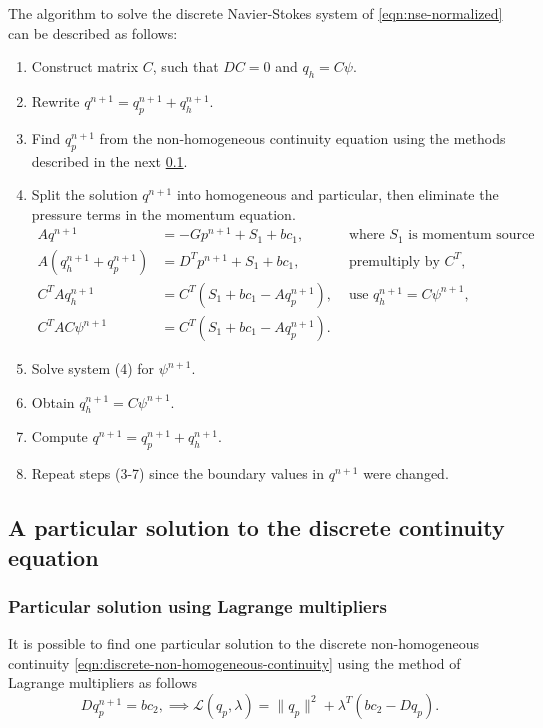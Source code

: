 \documentclass{article}
\begin{document}
The algorithm to solve the discrete Navier-Stokes system of \cref{eqn:nse-normalized} can be described as follows:
\begin{enumerate}
	\item Construct matrix $C$, such that $DC=0$ and $q_h=C\psi$.
	\item Rewrite $q^{n+1}=q^{n+1}_p+q^{n+1}_h$.
	\item Find $q^{n+1}_p$ from the non-homogeneous continuity equation using the methods described in the next \cref{sec:continuity-particular-solution}.
	\item Split the solution $q^{n+1}$ into homogeneous and particular, then eliminate the pressure terms in the momentum equation.
		\begin{align*}
			Aq^{n+1}&=-Gp^{n+1}+S_1+bc_1,&\text{ where $S_1$ is momentum source term,}\\
			A(q^{n+1}_h+q^{n+1}_p)&=D^Tp^{n+1}+S_1+bc_1, &\text{ premultiply by $C^T$,} \\
			C^TAq^{n+1}_h&=C^T(S_1+bc_1-Aq^{n+1}_p), &\text{ use $q^{n+1}_h=C\psi^{n+1}$,}\\
			C^TAC\psi^{n+1}&=C^T(S_1+bc_1-Aq^{n+1}_p).
		\end{align*}
	\item Solve system (4) for $\psi^{n+1}$. 
	\item Obtain $q_h^{n+1}=C\psi^{n+1}$.
	\item Compute $q^{n+1}=q^{n+1}_p+q^{n+1}_h$.
	\item Repeat steps (3-7) since the boundary values in $q^{n+1}$ were changed.
\end{enumerate}



\subsection{A particular solution to the discrete continuity equation}\label{sec:continuity-particular-solution}
\subsubsection{Particular solution using Lagrange multipliers}
It is possible to find one particular solution to the discrete non-homogeneous continuity \cref{eqn:discrete-non-homogeneous-continuity} using the method of Lagrange multipliers as follows
\begin{equation}\label{eqn:lagrange-multipliers}
	Dq_p^{n+1}=bc_2,\implies \mathcal{L}(q_p,\lambda)=
\|q_p\|^2+\lambda^T(bc_2-D q_p).
\end{equation}
\end{document}
